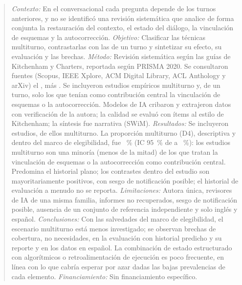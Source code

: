 \begin{abstract}
\textit{Contexto:} En el  conversacional cada pregunta depende de los turnos anteriores, y no se identificó una revisión sistemática que analice de forma conjunta la restauración del contexto, el estado del diálogo, la vinculación de esquemas y la autocorrección.
\textit{Objetivo:} Clasificar las técnicas multiturno, contrastarlas con las de un turno y sintetizar su efecto, su evaluación y las brechas.
\textit{Método:} Revisión sistemática según las guías de Kitchenham y Charters, reportada según PRISMA 2020. Se consultaron \nBases{} fuentes (Scopus, IEEE Xplore, ACM Digital Library, ACL Anthology y arXiv) el \fechaBusqueda{}, más . Se incluyeron estudios empíricos multiturno y, de un turno, solo los que tenían como contribución central la vinculación de esquemas o la autocorrección. Modelos de IA cribaron y extrajeron datos con verificación de la autora; la calidad se evaluó con \nItemsCalidad{} ítems al estilo de Kitchenham; la síntesis fue narrativa (SWiM).
\textit{Resultados:} Se incluyeron \nEstudios{} estudios, \nMultiturno{} de ellos multiturno. La proporción multiturno (D4), descriptiva y dentro del marco de elegibilidad, fue \DcuatroPct~\% (IC 95~\% de \DcuatroICinf{} a \DcuatroICsup~\%): los estudios multiturno son una minoría (menos de la mitad) de los que tratan la vinculación de esquemas o la autocorrección como contribución central. Predomina el historial plano; los contrastes dentro del estudio son mayoritariamente positivos, con sesgo de notificación posible; el historial de evaluación a menudo no se reporta.
\textit{Limitaciones:} Autora única, revisores de IA de una misma familia, informes no recuperados, sesgo de notificación posible, ausencia de un conjunto de referencia independiente y solo inglés y español.
\textit{Conclusiones:} Con las salvedades del marco de elegibilidad, el escenario multiturno está menos investigado; se observan brechas de cobertura, no necesidades, en la evaluación con historial predicho y su reporte y en los datos en español. La combinación de estado estructurado con  algorítmicos o retroalimentación de ejecución es poco frecuente, en línea con lo que cabría esperar por azar dadas las bajas prevalencias de cada elemento.
\textit{Financiamiento:} Sin financiamiento específico.
\end{abstract}


